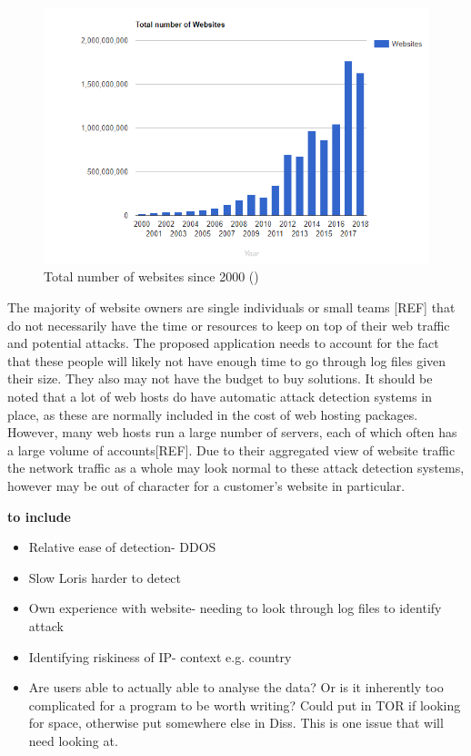 \begin{figure}[H] \label{Number of Websites} 
    \centering
    \includegraphics[width=\textwidth]{Images/numberOfWebsites.png}
    \caption{Total number of websites since 2000 (\cite{NumberofWebsites})}
    \label{Total number of websites since 2000}
\end{figure}
The majority of website owners are single individuals or small teams [REF] that do not necessarily have the time or resources to keep on top of their web traffic and potential attacks. The proposed application needs to account for the fact that these people will likely not have enough time to go through log files given their size. They also may not have the budget to buy solutions. It should be noted that a lot of web hosts do have automatic attack detection systems in place, as these are normally included in the cost of web hosting packages. However, many web hosts run a large number of servers, each of which often has a large volume of accounts[REF]. Due to their aggregated view of website traffic the network traffic as a whole may look normal to these attack detection systems, however may be out of character for a customer's website in particular.


\textbf{to include}
\begin{itemize}
    \item Relative ease of detection- DDOS 
    \item Slow Loris harder to detect \cite{aiello2014line}
    \item Own experience with website- needing to look through log files to identify attack
    \item Identifying riskiness of IP- context e.g. country
    \item Are users able to actually able to analyse the data? Or is it inherently too complicated for a program to be worth writing? Could put in TOR if looking for space, otherwise put somewhere else in Diss. This is one issue that will need looking at.
\end{itemize}

